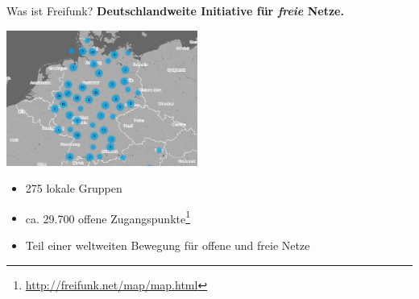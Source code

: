 \documentclass[10pt]{beamer}
\begin{document}
    \begin{frame}{Was ist Freifunk?}
      \large \textbf{Deutschlandweite Initiative für \emph{freie} Netze.}
      \pause
      \begin{center}
        \includegraphics[height=12em]{images/2016-02-17_map-de}
      \end{center}
      \begin{itemize}
        \item 275 lokale Gruppen
        \item ca. 29.700 offene Zugangspunkte\footnote{\url{http://freifunk.net/map/map.html}}
        \item Teil einer weltweiten Bewegung für offene und freie Netze
      \end{itemize}
    \end{frame}
\end{document}
